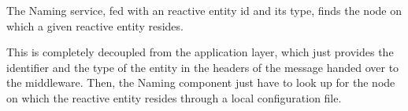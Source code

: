 The Naming service, fed with an reactive
entity id and its type, finds the node on
which a given reactive entity resides.

This is completely decoupled from the application
layer, which just provides the identifier and the type of the entity in the
headers of the message handed over to the middleware. Then, the
Naming component just have to look up for the node on which the reactive
entity resides through a local configuration file.
